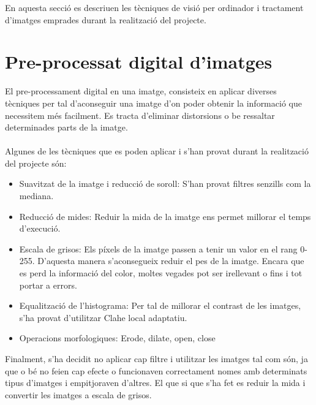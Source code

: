 En aquesta secció es descriuen les tècniques de visió per ordinador i tractament d'imatges emprades durant la realització del projecte.

\section{Pre-processat digital d'imatges}
	El pre-processament digital en una imatge, consisteix en aplicar diverses tècniques per tal d'aconseguir una imatge d'on poder obtenir la informació que necessitem més facilment. Es tracta
	d'eliminar distorsions o be ressaltar determinades parts de la imatge.\\\\
	Algunes de les tècniques que es poden aplicar i s'han provat durant la realització del projecte són:

	\begin{itemize}
		\item{Suavitzat de la imatge i reducció de soroll: S'han provat filtres senzills com la mediana.}
		\item{Reducció de mides: Reduir la mida de la imatge ens permet millorar el temps d'execució.}
		\item{Escala de grisos: Els píxels de la imatge passen a tenir un valor en el rang 0-255. D'aquesta manera s'aconsegueix reduir el pes de la imatge. Encara que es perd la informació del color, moltes
		vegades pot ser irellevant o fins i tot portar a errors.}
		\item{Equalització de l'histograma: Per tal de millorar el contrast de les imatges, s'ha provat d'utilitzar Clahe local adaptatiu.}
		\item{Operacions morfologiques: Erode, dilate, open, close}
	\end{itemize}
\noindent
	Finalment, s'ha decidit no aplicar cap filtre i utilitzar les imatges tal com són, ja que o bé no feien cap efecte o funcionaven correctament nomes amb determinats tipus d'imatges i empitjoraven d'altres.
	El que si que s'ha fet es reduir la mida i convertir les imatges a escala de grisos.

\newpage
